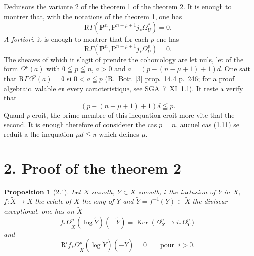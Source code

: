 \documentclass[12pt,a4paper]{article}
\theoremstyle{plain}
\newtheorem{proposition}[theorem]{Proposition}
\theoremstyle{definition}
\DeclareMathOperator{\Ker}{Ker}
\begin{document}
Deduisons the variante 2 of the theorem 1 of the theorem 2. It is enough to montrer that, with the notations of the theorem 1, one has
\[
\mathrm{R}\Gamma(\mathbf{P}^n, \mathrm{P}^{n-\mu+1} j_* \Omega_U^*) = 0.
\]
\textit{A fortiori}, it is enough to montrer that for each $p$ one has
\[
\mathrm{R}\Gamma(\mathbf{P}^n, \mathrm{P}^{n-\mu+1} j_* \Omega_U^p) = 0.
\]
The sheaves of which it s'agit of prendre the cohomology are let nuls, let of the form $\Omega^p(a)$ with $0 \leqq p \leqq n$, $a > 0$ and $a = (p-(n-\mu+1)+1)d$. One sait that $\mathrm{R}\Gamma\Omega^p(a) = 0$ si $0 < a \leqq p$ (R.~Bott~[3] prop.~14.4 p.~246; for a proof algebraic, valable en every caracteristique, see SGA~7~XI~1.1). It reste a verify that
\begin{equation}\label{eq:1.11}
(p-(n-\mu+1)+1)d \leqq p.
\tag{1.11}
\end{equation}
Quand $p$ croit, the prime membre of this inequation croit more vite that the second. It is enough therefore of considerer the cas $p = n$, auquel cas (1.11) se reduit a the inequation $\mu d \leqq n$ which defines $\mu$.


\section*{2. Proof of the theorem 2}

\begin{proposition}[2.1]
Let $X$ smooth, $Y \subset X$ smooth, $i$ the inclusion of $Y$ in $X$, $f : \tilde{X} \to X$ the eclate of $X$ the long of $Y$ and $\tilde{Y} = f^{-1}(Y) \subset \tilde{X}$ the diviseur exceptional. one has on $\tilde{X}$
\[
f_* \Omega_{\tilde{X}}^p(\log \tilde{Y})(-\tilde{Y}) = \Ker(\Omega_X^p \to i_* \Omega_Y^p)
\]
and
\[
\mathrm{R}^i f_* \Omega_{\tilde{X}}^p(\log \tilde{Y})(-\tilde{Y}) = 0 \qquad \text{pour }\ i > 0.
\]
\end{proposition}
\end{document}
